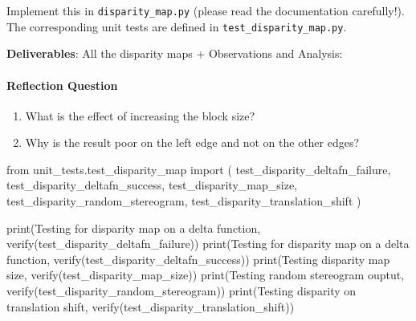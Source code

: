 \documentclass[
  letterpaper,
  DIV=11,
  numbers=noendperiod]{scrartcl}
\let\oldparagraph\paragraph
\renewcommand{\paragraph}[1]{\oldparagraph{#1}\mbox{}}
\newenvironment{Shaded}{\begin{snugshade}}{\end{snugshade}}
\newcommand{\BuiltInTok}[1]{\textcolor[rgb]{0.00,0.23,0.31}{#1}}
\newcommand{\ImportTok}[1]{\textcolor[rgb]{0.00,0.46,0.62}{#1}}
\newcommand{\NormalTok}[1]{\textcolor[rgb]{0.00,0.23,0.31}{#1}}
\newcommand{\StringTok}[1]{\textcolor[rgb]{0.13,0.47,0.30}{#1}}
\providecommand{\tightlist}{%
  \setlength{\itemsep}{0pt}\setlength{\parskip}{0pt}}\usepackage{longtable,booktabs,array}
\begin{document}
Implement this in \texttt{disparity\_map.py} (please read the
documentation carefully!). The corresponding unit tests are defined in
\texttt{test\_disparity\_map.py}.

\textbf{Deliverables}: All the disparity maps + Observations and
Analysis:

\hypertarget{reflection-question-1}{%
\paragraph{Reflection Question}\label{reflection-question-1}}

\begin{enumerate}
\def\labelenumi{\arabic{enumi}.}
\tightlist
\item
  What is the effect of increasing the block size?
\item
  Why is the result poor on the left edge and not on the other edges?
\end{enumerate}

\begin{Shaded}
\begin{Highlighting}[]
\ImportTok{from}\NormalTok{ unit\_tests.test\_disparity\_map }\ImportTok{import}\NormalTok{ (}
\NormalTok{  test\_disparity\_deltafn\_failure,}
\NormalTok{  test\_disparity\_deltafn\_success,}
\NormalTok{  test\_disparity\_map\_size,}
\NormalTok{  test\_disparity\_random\_stereogram,}
\NormalTok{  test\_disparity\_translation\_shift}
\NormalTok{)}
\end{Highlighting}
\end{Shaded}

\begin{Shaded}
\begin{Highlighting}[]
\BuiltInTok{print}\NormalTok{(}\StringTok{\textquotesingle{}Testing for disparity map on a delta function\textquotesingle{}}\NormalTok{, verify(test\_disparity\_deltafn\_failure))}
\BuiltInTok{print}\NormalTok{(}\StringTok{\textquotesingle{}Testing for disparity map on a delta function\textquotesingle{}}\NormalTok{, verify(test\_disparity\_deltafn\_success))}
\BuiltInTok{print}\NormalTok{(}\StringTok{\textquotesingle{}Testing disparity map size\textquotesingle{}}\NormalTok{, verify(test\_disparity\_map\_size))}
\BuiltInTok{print}\NormalTok{(}\StringTok{\textquotesingle{}Testing random stereogram ouptut\textquotesingle{}}\NormalTok{, verify(test\_disparity\_random\_stereogram))}
\BuiltInTok{print}\NormalTok{(}\StringTok{\textquotesingle{}Testing disparity on translation shift\textquotesingle{}}\NormalTok{, verify(test\_disparity\_translation\_shift))}
\end{Highlighting}
\end{Shaded}
\end{document}
